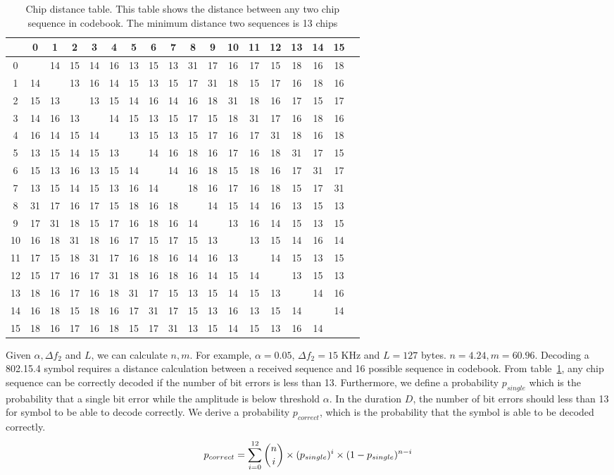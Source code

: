 \begin{table}
\begin{center}
	\begin{tabular}{c||c|c|c|c|c|c|c|c|c|c|c|c|c|c|c|c c} 
			& 0& 1& 2& 3& 4& 5& 6& 7& 8& 9&10&11&12&13&14&15	\\ \hline\hline
		0	&  &14&15&14&16&13&15&13&31&17&16&17&15&18&16&18 	\\ \hline
		1	&14&  &13&16&14&15&13&15&17&31&18&15&17&16&18&16 	\\ \hline
		2	&15&13&  &13&15&14&16&14&16&18&31&18&16&17&15&17	\\ \hline
		3	&14&16&13&  &14&15&13&15&17&15&18&31&17&16&18&16	\\ \hline
		4	&16&14&15&14&  &13&15&13&15&17&16&17&31&18&16&18	\\ \hline
		5	&13&15&14&15&13&  &14&16&18&16&17&16&18&31&17&15	\\ \hline
		6	&15&13&16&13&15&14&  &14&16&18&15&18&16&17&31&17	\\ \hline
		7	&13&15&14&15&13&16&14&  &18&16&17&16&18&15&17&31	\\ \hline
		8	&31&17&16&17&15&18&16&18&  &14&15&14&16&13&15&13	\\ \hline
		9	&17&31&18&15&17&16&18&16&14&  &13&16&14&15&13&15	\\ \hline
		10	&16&18&31&18&16&17&15&17&15&13&  &13&15&14&16&14	\\ \hline
		11	&17&15&18&31&17&16&18&16&14&16&13&  &14&15&13&15	\\ \hline
		12	&15&17&16&17&31&18&16&18&16&14&15&14&  &13&15&13	\\ \hline
		13	&18&16&17&16&18&31&17&15&13&15&14&15&13&  &14&16	\\ \hline
		14	&16&18&15&18&16&17&31&17&15&13&16&13&15&14&  &14	\\ \hline
		15	&18&16&17&16&18&15&17&31&13&15&14&15&13&16&14&  	
	\end{tabular}
	\caption{Chip distance table. This table shows the distance between any two chip sequence
		in codebook. The minimum distance two sequences is 13 chips}
	\label{tab:chip_distance}
\end{center}
\end{table}

Given $\alpha, \Delta f_2$ and $L$, we can calculate $n, m$. For example, $\alpha = 0.05$, 
$\Delta f_2 = 15$ KHz and $L = 127$ bytes. $n = 4.24, m = 60.96$. Decoding a 802.15.4 symbol
requires a distance calculation between a received sequence and 16 possible sequence in codebook.
From table~\ref{tab:chip_distance}, any chip sequence can be correctly decoded if the number of
bit errors is less than 13. Furthermore, we define a probability $p_{single}$ which is the 
probability that a single bit error while the amplitude is below threshold $\alpha$. In the duration
$D$, the number of bit errors should less than 13 for symbol to be able to decode correctly. We derive 
a probability $p_{correct}$, which is the probability that the symbol is able to be decoded correctly.
\begin{equation}
p_{correct} = \sum_{i=0}^{12} \dbinom{n}{i}\times(p_{single})^i\times(1-p_{single})^{n-i}
\end{equation}

